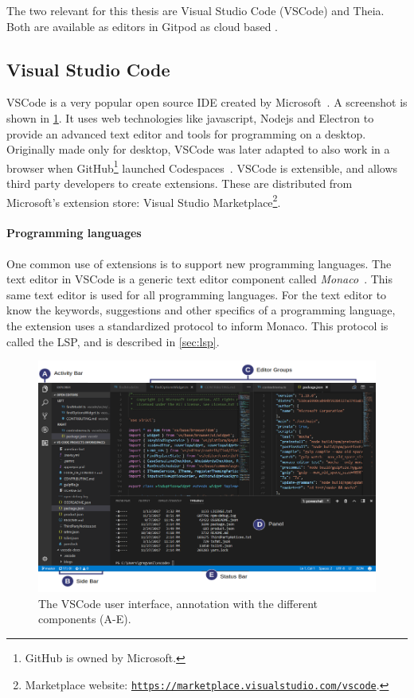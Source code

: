 The two  relevant for this thesis are Visual Studio Code (\gls{VSCode}) and \gls{Theia}.
Both are available as editors in \gls{Gitpod} as cloud based .

\subsection{Visual Studio Code}

\Gls{VSCode} is a very popular \gls{open source} \acrshort{IDE} created by Microsoft~\cite{stackoverflowStackOverflowDeveloper2019}.
A screenshot is shown in \cref{fig:vscode-ui}.
It uses web technologies like javascript, \gls{Nodejs} and \gls{Electron} to provide an advanced text editor and tools for programming on a desktop.
Originally made only for desktop, \gls{VSCode} was later adapted to also work in a browser when \gls{GitHub}\footnote{GitHub is owned by Microsoft.} launched Codespaces~\cite{svenefftingeProductRoadmapQ1}.
\Gls{VSCode} is extensible, and allows third party developers to create extensions.
These are distributed from Microsoft's extension store: Visual Studio Marketplace\footnote{Marketplace website: \href{https://marketplace.visualstudio.com/vscode}{\nolinkurl{https://marketplace.visualstudio.com/vscode}}.}.

\paragraph{Programming languages}
One common use of extensions is to support new programming languages.
The text editor in \gls{VSCode} is a generic text editor component called \textit{Monaco}~\cite{benjaminpaseroSourceCodeOrganization2020}.
This same text editor is used for all programming languages.
For the text editor to know the keywords, suggestions and other specifics of a programming language, the extension uses a standardized protocol to inform Monaco.
This protocol is called the \acrlong{LSP}, and is described in \cref{sec:lsp}.

\begin{figure}[htbp]  %
  \centering
  \includegraphics[width=\textwidth]{figures/pre-project/vscode-ui.png}
  \caption[VSCode User Interface]{The \gls{VSCode} user interface, annotation with the different components (A-E).}\label{fig:vscode-ui}
\end{figure}

